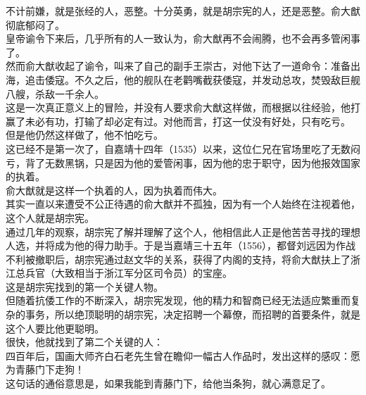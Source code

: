 \begin{multicols}{\theparacolNo}
不计前嫌，就是张经的人，恶整。十分英勇，就是胡宗宪的人，还是恶整。俞大猷彻底郁闷了。\\

皇帝谕令下来后，几乎所有的人一致认为，俞大猷再不会闹腾，也不会再多管闲事了。\\

然而俞大猷收起了谕令，叫来了自己的副手王崇古，对他下达了一道命令：准备出海，追击倭寇。不久之后，他的舰队在老鹳嘴截获倭寇，并发动总攻，焚毁敌巨舰八艘，杀敌一千余人。\\

这是一次真正意义上的冒险，并没有人要求俞大猷这样做，而根据以往经验，他打赢了未必有功，打输了却必定有过。对他而言，打这一仗没有好处，只有吃亏。\\

但是他仍然这样做了，他不怕吃亏。\\

这已经不是第一次了，自嘉靖十四年（1535）以来，这位仁兄在官场里吃了无数闷亏，背了无数黑锅，只是因为他的爱管闲事，因为他的忠于职守，因为他报效国家的执着。\\

俞大猷就是这样一个执着的人，因为执着而伟大。\\

其实一直以来遭受不公正待遇的俞大猷并不孤独，因为有一个人始终在注视着他，这个人就是胡宗宪。\\

通过几年的观察，胡宗宪了解并理解了这个人，他相信此人正是他苦苦寻找的理想人选，并将成为他的得力助手。于是当嘉靖三十五年（1556），都督刘远因为作战不利被撤职后，胡宗宪通过赵文华的关系，获得了内阁的支持，将俞大猷扶上了浙江总兵官（大致相当于浙江军分区司令员）的宝座。\\

这是胡宗宪找到的第一个关键人物。\\

但随着抗倭工作的不断深入，胡宗宪发现，他的精力和智商已经无法适应繁重而复杂的事务，所以绝顶聪明的胡宗宪，决定招聘一个幕僚，而招聘的首要条件，就是这个人要比他更聪明。\\

很快，他就找到了第二个关键的人：\\

四百年后，国画大师齐白石老先生曾在瞻仰一幅古人作品时，发出这样的感叹：愿为青藤门下走狗！\\

这句话的通俗意思是，如果我能到青藤门下，给他当条狗，就心满意足了。\\


\end{multicols}
